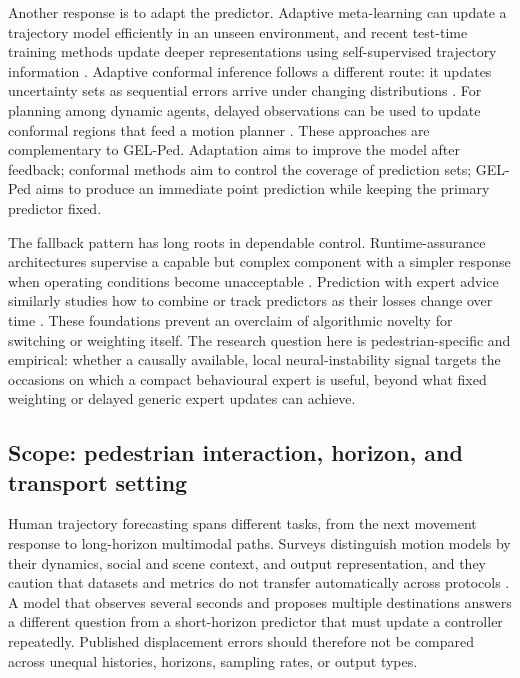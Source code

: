 Another response is to adapt the predictor. Adaptive meta-learning can update a trajectory model efficiently in an unseen environment, and recent test-time training methods update deeper representations using self-supervised trajectory information \citep{ivanovic2023adaptive,park2024t4p}. Adaptive conformal inference follows a different route: it updates uncertainty sets as sequential errors arrive under changing distributions \citep{gibbs2021adaptive}. For planning among dynamic agents, delayed observations can be used to update conformal regions that feed a motion planner \citep{dixit2023adaptive}. These approaches are complementary to GEL-Ped. Adaptation aims to improve the model after feedback; conformal methods aim to control the coverage of prediction sets; GEL-Ped aims to produce an immediate point prediction while keeping the primary predictor fixed.

The fallback pattern has long roots in dependable control. Runtime-assurance architectures supervise a capable but complex component with a simpler response when operating conditions become unacceptable \citep{sha2001simplicity}. Prediction with expert advice similarly studies how to combine or track predictors as their losses change over time \citep{herbster1998tracking,cesabianchi2006prediction}. These foundations prevent an overclaim of algorithmic novelty for switching or weighting itself. The research question here is pedestrian-specific and empirical: whether a causally available, local neural-instability signal targets the occasions on which a compact behavioural expert is useful, beyond what fixed weighting or delayed generic expert updates can achieve.

\subsection{Scope: pedestrian interaction, horizon, and transport setting}

Human trajectory forecasting spans different tasks, from the next movement response to long-horizon multimodal paths. Surveys distinguish motion models by their dynamics, social and scene context, and output representation, and they caution that datasets and metrics do not transfer automatically across protocols \citep{rudenko2020survey,kothari2022}. A model that observes several seconds and proposes multiple destinations answers a different question from a short-horizon predictor that must update a controller repeatedly. Published displacement errors should therefore not be compared across unequal histories, horizons, sampling rates, or output types.

